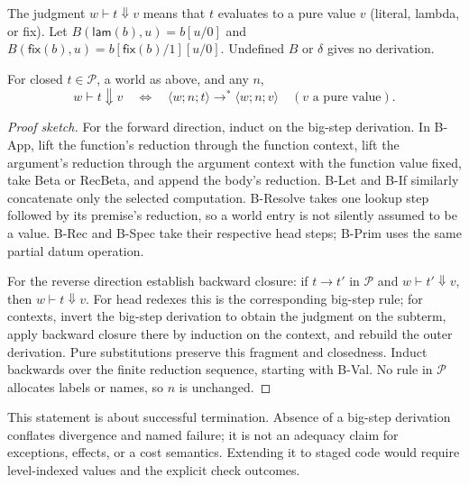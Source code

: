 \documentclass[acmsmall,screen,review,nonacm]{acmart}
\newcommand{\kw}[1]{\mathsf{#1}}
\newcommand{\cfg}[3]{\langle #1;#2;#3\rangle}
\newcommand{\step}{\longrightarrow}
\newcommand{\steps}{\longrightarrow^{*}}
\newcommand{\bigj}[3]{#1\vdash #2\Downarrow #3}
\newcommand{\app}[2]{\kw{app}(#1,#2)}
\newcommand{\lam}[1]{\kw{lam}(#1)}
\newcommand{\fix}[1]{\kw{fix}(#1)}
\newcommand{\lit}[1]{\kw{lit}(#1)}
\begin{document}
The judgment $\bigj w t v$ means that $t$ evaluates to a pure value $v$
(literal, lambda, or fix). Let $B(\lam b,u)=b[u/0]$ and
$B(\fix b,u)=b[\fix b/1][u/0]$. Undefined $B$ or $\delta$ gives no derivation.

\begin{proposition}\label{prop:big}
For closed $t\in\mathcal P$, a world as above, and any $n$,
\[
 \bigj w t v\quad\Longleftrightarrow\quad
 \cfg w n t\steps\cfg w n v\quad(v\text{ a pure value}).
\]
\end{proposition}
\begin{proof}[Proof sketch]
For the forward direction, induct on the big-step derivation. In B-App,
lift the function's reduction through the function context, lift the
argument's reduction through the argument context with the function value
fixed, take Beta or RecBeta, and append the body's reduction. B-Let and
B-If similarly concatenate only the selected computation. B-Resolve takes
one lookup step followed by its premise's reduction, so a world entry is
not silently assumed to be a value. B-Rec and B-Spec take their respective
head steps; B-Prim uses the same partial datum operation.

For the reverse direction establish backward closure:
if $t\step t'$ in $\mathcal P$ and $\bigj w {t'}v$, then $\bigj w t v$.
For head redexes this is the corresponding big-step rule; for contexts,
invert the big-step derivation to obtain the judgment on the subterm,
apply backward closure there by induction on the context, and rebuild the
outer derivation. Pure substitutions preserve this fragment and closedness.
Induct backwards over the finite reduction sequence, starting with B-Val.
No rule in $\mathcal P$ allocates labels or names, so $n$ is unchanged.
\end{proof}
This statement is about successful termination. Absence of a big-step
derivation conflates divergence and named failure; it is not an adequacy
claim for exceptions, effects, or a cost semantics. Extending it to staged
code would require level-indexed values and the explicit check outcomes.
\end{document}
